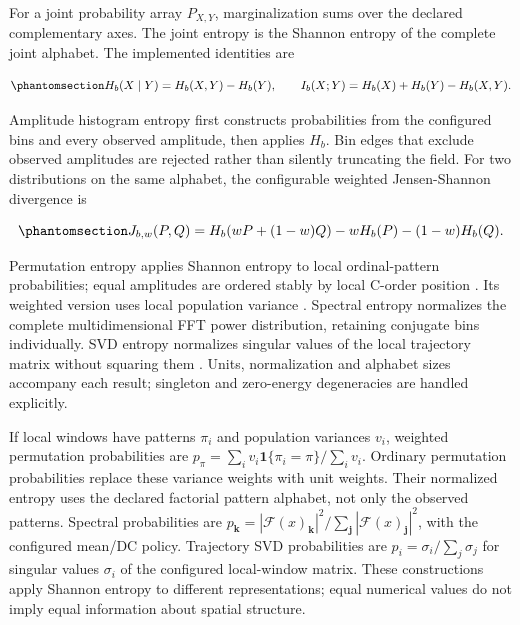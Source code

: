 \documentclass[
  english,
  11pt,
]{article}
\begin{document}
For a joint probability array \(P_{X,Y}\), marginalization sums over the
declared complementary axes. The joint entropy is the Shannon entropy of
the complete joint alphabet. The implemented identities are

\begin{equation}\protect\phantomsection\label{eq:information-identities}{
H_b(X\mid Y)=H_b(X,Y)-H_b(Y),\qquad
I_b(X;Y)=H_b(X)+H_b(Y)-H_b(X,Y).
}\end{equation}

Amplitude histogram entropy first constructs probabilities from the
configured bins and every observed amplitude, then applies \(H_b\). Bin
edges that exclude observed amplitudes are rejected rather than silently
truncating the field. For two distributions on the same alphabet, the
configurable weighted Jensen-Shannon divergence is

\begin{equation}\protect\phantomsection\label{eq:weighted-js}{
J_{b,w}(P,Q)=H_b(wP+(1-w)Q)-wH_b(P)-(1-w)H_b(Q).
}\end{equation}

Permutation entropy applies Shannon entropy to local ordinal-pattern
probabilities; equal amplitudes are ordered stably by local C-order
position \citep{bandt2002}. Its weighted version uses local population
variance \citep{fadlallah2013}. Spectral entropy normalizes the complete
multidimensional FFT power distribution, retaining conjugate bins
individually. SVD entropy normalizes singular values of the local
trajectory matrix without squaring them
\citep{rezek1998, broomhead1986}. Units, normalization and alphabet
sizes accompany each result; singleton and zero-energy degeneracies are
handled explicitly.

If local windows have patterns \(\pi_i\) and population variances
\(v_i\), weighted permutation probabilities are
\(p_\pi=\sum_i v_i\mathbf1\{\pi_i=\pi\}/\sum_i v_i\). Ordinary
permutation probabilities replace these variance weights with unit
weights. Their normalized entropy uses the declared factorial pattern
alphabet, not only the observed patterns. Spectral probabilities are
\(p_{\boldsymbol k}=|\mathcal F(x)_{\boldsymbol k}|^2/\sum_{\boldsymbol j}
|\mathcal F(x)_{\boldsymbol j}|^2\), with the configured mean/DC policy.
Trajectory SVD probabilities are \(p_i=\sigma_i/\sum_j\sigma_j\) for
singular values \(\sigma_i\) of the configured local-window matrix.
These constructions apply Shannon entropy to different representations;
equal numerical values do not imply equal information about spatial
structure.
\end{document}
